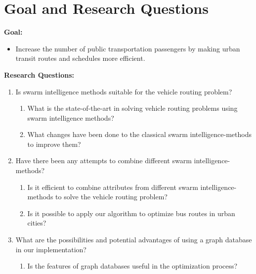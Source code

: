 \section{Goal and Research Questions}
\textbf{Goal:}
\begin{itemize}
\item \label{itm:goal} Increase the number of public transportation passengers by making urban transit routes and schedules more efficient.
\end{itemize}
\textbf{Research Questions:}
\begin{enumerate}
  \item Is swarm intelligence methods suitable for the vehicle routing problem?
    \begin{enumerate}
    \item What is the state-of-the-art in solving vehicle routing problems using swarm intelligence methods?
    \item What changes have been done to the classical swarm intelligence-methods to improve them?
  \end{enumerate}
 
\item Have there been any attempts to combine different swarm intelligence-methods?

    \begin{enumerate}
    \item Is it efficient to combine attributes from different swarm intelligence-methods to solve the vehicle routing problem?
    \item Is it possible to apply our algorithm to optimize bus routes in urban cities?
  \end{enumerate}

\item What are the possibilities and potential advantages of using a graph database in our implementation?
\begin{enumerate}
\item Is the features of graph databases useful in the optimization process? 
\end{enumerate}
\end{enumerate}